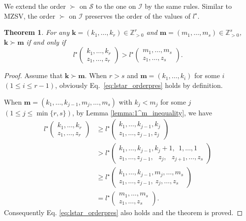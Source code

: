\documentclass[12pt,a4paper]{article}
\newtheorem{thm}[defi]{Theorem}
\theoremstyle{remark}
\begin{document}
We extend the order $\succ$ on $\mathcal{S}$
to the one on $\mathcal{I}$ by the same rules.
Similar to MZSV,
the order $\succ$ on $\mathcal{I}$
preserves the order of the values of $l^{\star}$.
\begin{thm}
For any 
$\boldsymbol{k}=(k_1, \ldots, k_r)\in \mathbb{Z}_{>0}^r$ and 
$\boldsymbol{m}=(m_1, \ldots, m_s)\in \mathbb{Z}_{>0}^s$,
$\boldsymbol{k}\succ \boldsymbol{m}$
if and only if 
\begin{equation}\label{eq:lstar_orderpres}
    l^{\star}\begin{pmatrix}
k_1, \ldots , k_r\\
z_1, \ldots , z_r
\end{pmatrix}
> l^{\star}\begin{pmatrix}
m_1, \ldots , m_s\\
z_1, \ldots , z_s
\end{pmatrix}.
\end{equation} 
\end{thm}

\begin{proof}
Assume that $\boldsymbol{k}\succ \boldsymbol{m}$.
When $r>s$ and $\boldsymbol{m}=(k_1,\ldots ,k_i)$
for some $i$ $(1\le i \le r-1)$,
obviously Eq.~\eqref{eq:lstar_orderpres} holds by definition.

When $\boldsymbol{m}=(k_1,\ldots ,k_{j-1},
m_j,\ldots , m_s)$
with $k_j<m_j$ for some $j$ $(1\le j \le \min\{r,s\})$,
by Lemma \ref{lemma:1^m_inequality},
we have
 \begin{align*}
 l^{\star}\begin{pmatrix}
  k_1, \ldots , k_r\\
  z_1, \ldots , z_r
 \end{pmatrix}
&\ge
 l^{\star}\begin{pmatrix}
  k_1, \ldots, k_{j-1}, k_j\\
  z_1, \ldots, z_{j-1},  z_j
 \end{pmatrix}\\
&>
 l^{\star}\begin{pmatrix}
  k_1, \ldots, k_{j-1}, k_j+1, \ \ 1,\ldots , 1\\
  z_1, \ldots, z_{j-1}, \ \  \ z_j, \ \ \ z_{j+1}, \ldots ,z_s
 \end{pmatrix}\\
&\ge
 l^{\star}\begin{pmatrix}
  k_1, \ldots, k_{j-1}, m_j, \ldots , m_s \\
  z_1, \ldots, z_{j-1}, \ z_j, \ldots , z_s
 \end{pmatrix}\\
&=
l^{\star}\begin{pmatrix}
m_1, \ldots , m_s\\
z_1, \ldots , z_s
\end{pmatrix}.
\end{align*}
Consequently
Eq. \eqref{eq:lstar_orderpres} also holds
and the theorem is proved.
\end{proof}
\end{document}
